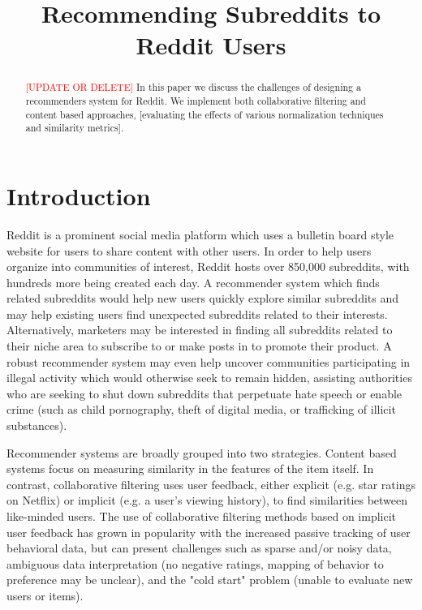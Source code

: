 \documentclass{article}
\title{Recommending Subreddits to Reddit Users}
\author{
}
\begin{document}

\maketitle

\begin{abstract}
\textcolor{red}{[UPDATE OR DELETE]} In this paper we discuss the challenges of designing a recommenders system for Reddit.  We implement both collaborative filtering and content based approaches, [evaluating the effects of various normalization techniques and similarity metrics].  
\end{abstract}

\section{Introduction}
\label{sec:intro}
Reddit is a prominent social media platform which uses a bulletin board style website for users to share content with other users. In order to help users organize into communities of interest, Reddit hosts over 850,000 subreddits, with hundreds more being created each day.  A recommender system which finds related subreddits would help new users quickly explore similar subreddits and may help existing users find unexpected subreddits related to their interests. Alternatively, marketers may be interested in finding all subreddits related to their niche area to subscribe to or make posts in to promote their product. A robust recommender system may even help uncover communities participating in illegal activity which would otherwise seek to remain hidden, assisting authorities who are seeking to shut down subreddits that perpetuate hate speech or enable crime (such as child pornography, theft of digital media, or trafficking of illicit substances).

Recommender systems are broadly grouped into two strategies.  Content based systems focus on measuring similarity in the features of the item itself.  In contrast, collaborative filtering uses user feedback, either explicit (e.g. star ratings on Netflix) or implicit (e.g. a user’s viewing history), to find similarities between like-minded users.  The use of collaborative filtering methods based on implicit user feedback has grown in popularity with the increased passive tracking of user behavioral data, but can present challenges such as sparse and/or noisy data, ambiguous data interpretation (no negative ratings, mapping of behavior to preference may be unclear), and the "cold start" problem (unable to evaluate new users or items).  
\end{document}
